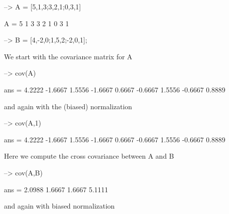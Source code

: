 \begin{DoxyVerbInclude}
--> A = [5,1,3;3,2,1;0,3,1]

A = 
 5 1 3 
 3 2 1 
 0 3 1 

--> B = [4,-2,0;1,5,2;-2,0,1];
\end{DoxyVerbInclude}


We start with the covariance matrix for {\ttfamily A}


\begin{DoxyVerbInclude}
--> cov(A)

ans = 
    4.2222   -1.6667    1.5556 
   -1.6667    0.6667   -0.6667 
    1.5556   -0.6667    0.8889 
\end{DoxyVerbInclude}


and again with the (biased) normalization


\begin{DoxyVerbInclude}
--> cov(A,1)

ans = 
    4.2222   -1.6667    1.5556 
   -1.6667    0.6667   -0.6667 
    1.5556   -0.6667    0.8889 
\end{DoxyVerbInclude}


Here we compute the cross covariance between {\ttfamily A} and {\ttfamily B}


\begin{DoxyVerbInclude}
--> cov(A,B)

ans = 
    2.0988    1.6667 
    1.6667    5.1111 
\end{DoxyVerbInclude}


and again with biased normalization


